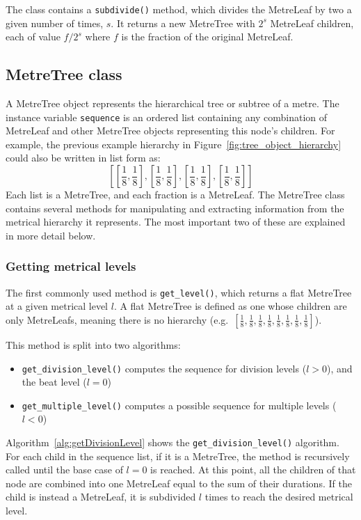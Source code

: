 \documentclass[12pt,twoside,openright]{report}
\begin{document}
The class contains a \verb'subdivide()' method, which divides the MetreLeaf by two a
given number of times, $s$. It returns a new MetreTree with $2^s$ MetreLeaf children, each of value $f/2^s$ where $f$ is the fraction of the original MetreLeaf.


\subsection{MetreTree class} \label{metretree}

A MetreTree object represents the hierarchical tree or subtree of a metre. The
instance variable \verb'sequence' is an ordered list containing any combination of
MetreLeaf and other MetreTree objects representing this node's children. For
example, the previous example hierarchy in Figure~\ref{fig:tree_object_hierarchy} could also be written in list form as:
\[\left[\left[\frac{1}{8},\frac{1}{8}\right],\left[\frac{1}{8},\frac{1}{8}\right],\left[\frac{1}{8},\frac{1}{8}\right],\left[\frac{1}{8},\frac{1}{8}\right]\right]\]
Each list is a
MetreTree, and each fraction is a MetreLeaf. The MetreTree class contains
several methods for manipulating and extracting information from the metrical
hierarchy it represents. The most important two of these are explained in more
detail below.

\subsubsection{Getting metrical levels} \label{get_level}

The first commonly used method is \verb'get_level()', which returns a flat MetreTree at
a given metrical level $l$. A flat MetreTree is defined as one whose children are
only MetreLeafs, meaning there is no hierarchy (e.g.\ $\left[\frac{1}{8},\frac{1}{8},\frac{1}{8},\frac{1}{8},\frac{1}{8},\frac{1}{8},\frac{1}{8},\frac{1}{8}\right]$).

This method is split into two algorithms:
\begin{itemize}
    \item \verb'get_division_level()' computes the sequence for division levels ($l>0$), and the beat level ($l=0$)
	\item \verb'get_multiple_level()' computes a possible sequence for multiple levels ($l<0$)
\end{itemize}

Algorithm~\ref{alg:getDivisionLevel} shows the \verb'get_division_level()' algorithm. For each child in the
sequence list, if it is a MetreTree, the method is recursively called until the
base case of $l=0$ is reached. At this point, all the children of that node are
combined into one MetreLeaf equal to the sum of their durations. If the child is
instead a MetreLeaf, it is subdivided $l$ times to reach the desired metrical
level.
\end{document}
